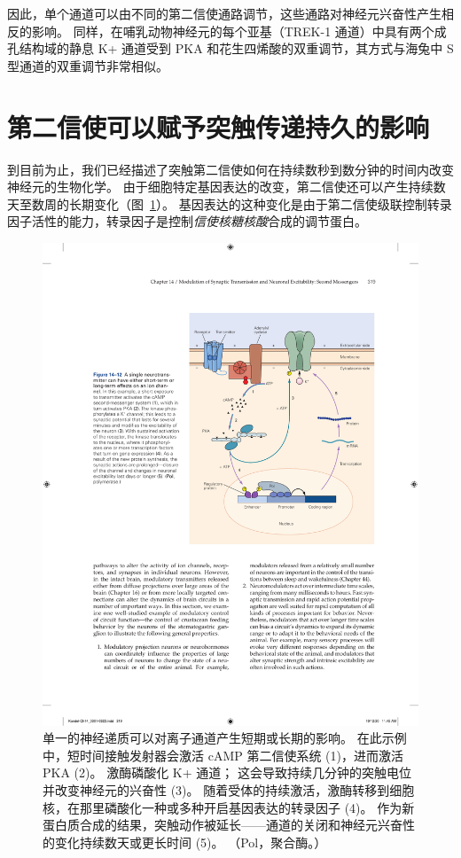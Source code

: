 因此，单个通道可以由不同的第二信使通路调节，这些通路对神经元兴奋性产生相反的影响。
同样，在哺乳动物神经元的每个亚基（TREK-1 通道）中具有两个成孔结构域的静息 K+ 通道受到 PKA 和花生四烯酸的双重调节，其方式与海兔中 S 型通道的双重调节非常相似。



\section{第二信使可以赋予突触传递持久的影响}

到目前为止，我们已经描述了突触第二信使如何在持续数秒到数分钟的时间内改变神经元的生物化学。
由于细胞特定基因表达的改变，第二信使还可以产生持续数天至数周的长期变化（图~\ref{fig:14_12}）。 
基因表达的这种变化是由于第二信使级联控制转录因子活性的能力，转录因子是控制\textit{信使核糖核酸}合成的调节蛋白。


\begin{figure}[htbp]
	\centering
	\includegraphics[width=0.7\linewidth]{chap14/fig_14_12}
	\caption{单一的神经递质可以对离子通道产生短期或长期的影响。 在此示例中，短时间接触发射器会激活 cAMP 第二信使系统 (1)，进而激活 PKA (2)。 激酶磷酸化 K+ 通道； 这会导致持续几分钟的突触电位并改变神经元的兴奋性 (3)。 随着受体的持续激活，激酶转移到细胞核，在那里磷酸化一种或多种开启基因表达的转录因子 (4)。 作为新蛋白质合成的结果，突触动作被延长——通道的关闭和神经元兴奋性的变化持续数天或更长时间 (5)。 （Pol，聚合酶。）}
	\label{fig:14_12}
\end{figure}



